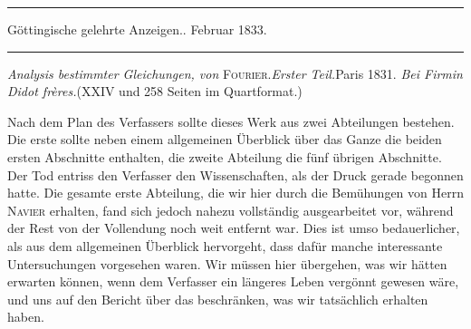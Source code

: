 \clearpage
{}
\begin{center}
\rule{0.55\linewidth}{0.4pt}\par Göttingische gelehrte Anzeigen.. Februar 1833.\par \rule{0.55\linewidth}{0.4pt}
\end{center}
\textit{Analysis bestimmter Gleichungen, von} \textsc{Fourier}.\quad\textit{Erster Teil.}\quad Paris 1831. \textit{Bei Firmin Didot frères.}\quad (XXIV und 258 Seiten im Quartformat.)

Nach dem Plan des Verfassers sollte dieses Werk aus zwei Abteilungen bestehen. Die erste sollte neben einem allgemeinen Überblick über das Ganze die beiden ersten Abschnitte enthalten, die zweite Abteilung die fünf übrigen Abschnitte. Der Tod entriss den Verfasser den Wissenschaften, als der Druck gerade begonnen hatte. Die gesamte erste Abteilung, die wir hier durch die Bemühungen von Herrn \textsc{Navier} erhalten, fand sich jedoch nahezu vollständig ausgearbeitet vor, während der Rest von der Vollendung noch weit entfernt war. Dies ist umso bedauerlicher, als aus dem allgemeinen Überblick hervorgeht, dass dafür manche interessante Untersuchungen vorgesehen waren. Wir müssen hier übergehen, was wir hätten erwarten können, wenn dem Verfasser ein längeres Leben vergönnt gewesen wäre, und uns auf den Bericht über das beschränken, was wir tatsächlich erhalten haben.

